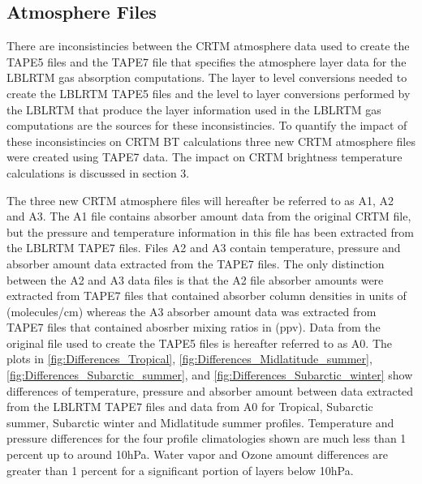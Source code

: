 \subsection{Atmosphere Files}
There are inconsistincies between the CRTM atmosphere data used to create the TAPE5 files and the TAPE7 file that specifies the atmosphere layer data for the LBLRTM gas
absorption computations. The layer to level conversions needed to create the LBLRTM TAPE5 files and the level to layer conversions performed by the LBLRTM that produce the layer information used in the LBLRTM gas computations are the sources for these inconsistincies. To quantify the impact of these inconsistincies on CRTM BT calculations three new CRTM atmosphere files were created using TAPE7 data. The impact on CRTM brightness temperature calculations is discussed in section 3.

The three new CRTM atmosphere files will hereafter be referred to as A1, A2 and A3. The A1 file contains absorber amount data from the original CRTM file, but the pressure and temperature information in this file has been extracted from the LBLRTM TAPE7 files. Files A2 and A3 contain temperature, pressure and absorber amount data extracted from the TAPE7 files. The only distinction between the A2 and A3 data files is that the A2 file absorber amounts were extracted from TAPE7 files that contained absorber column densities in units of (molecules/cm) whereas the A3 absorber amount data was extracted from TAPE7 files that contained abosrber mixing ratios in (ppv). Data from the original file used to create the TAPE5 files is hereafter referred to as A0. The plots in \ref{fig:Differences_Tropical}, \ref{fig:Differences_Midlatitude_summer}, \ref{fig:Differences_Subarctic_summer}, and \ref{fig:Differences_Subarctic_winter} show differences of temperature, pressure and absorber amount between data extracted from the LBLRTM TAPE7 files and data from A0 for Tropical, Subarctic summer, Subarctic winter and Midlatitude summer profiles. Temperature and pressure differences for the four profile climatologies shown are much less than 1 percent up to around 10hPa. Water vapor and Ozone amount differences are greater than 1 percent for a significant portion of layers below 10hPa. %

